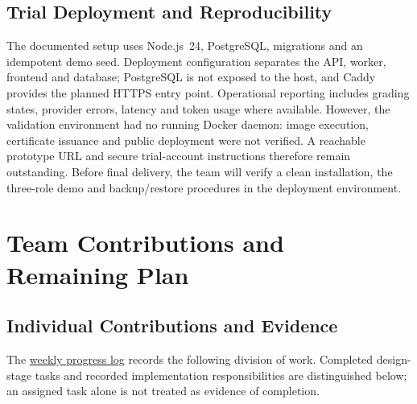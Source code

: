 \subsection{Trial Deployment and Reproducibility}
The documented setup uses Node.js~24, PostgreSQL, migrations and an idempotent
demo seed. Deployment configuration separates the API, worker, frontend and
database; PostgreSQL is not exposed to the host, and Caddy provides the
planned HTTPS entry point. Operational reporting includes grading states,
provider errors, latency and token usage where available. However, the
validation environment had no running Docker daemon: image execution,
certificate issuance and public deployment were not verified. A reachable
prototype URL and secure trial-account instructions therefore remain
outstanding. Before final delivery, the team will verify a clean installation,
the three-role demo and backup/restore procedures in the deployment environment.

\section{Team Contributions and Remaining Plan}
\label{sec:plan}

\subsection{Individual Contributions and Evidence}
The
\href{https://docs.google.com/document/d/1tDeQUFaP0ttOuAwh-ihx1wdaSiAIPZxqVrUM3X8RfFQ/edit}{weekly progress log}
records the following division of work. Completed design-stage tasks and
recorded implementation responsibilities are distinguished below; an assigned
task alone is not treated as evidence of completion.

